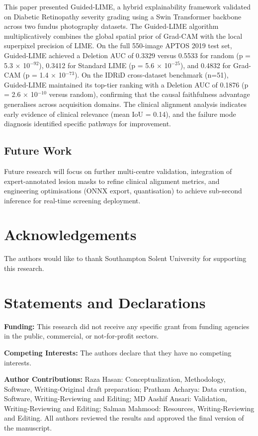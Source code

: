 \documentclass[10pt,twoside]{article}
\begin{document}
This paper presented Guided-LIME, a hybrid explainability framework validated on Diabetic Retinopathy severity grading using a Swin Transformer backbone across two fundus photography datasets. The Guided-LIME algorithm multiplicatively combines the global spatial prior of Grad-CAM with the local superpixel precision of LIME. On the full 550-image APTOS 2019 test set, Guided-LIME achieved a Deletion AUC of 0.3329 versus 0.5533 for random (p = 5.3 $\times$ 10$^{-92}$), 0.3412 for Standard LIME (p = 5.6 $\times$ 10$^{-25}$), and 0.4832 for Grad-CAM (p = 1.4 $\times$ 10$^{-73}$). On the IDRiD cross-dataset benchmark (n=51), Guided-LIME maintained its top-tier ranking with a Deletion AUC of 0.1876 (p = 2.6 $\times$ 10$^{-10}$ versus random), confirming that the causal faithfulness advantage generalises across acquisition domains. The clinical alignment analysis indicates early evidence of clinical relevance (mean IoU = 0.14), and the failure mode diagnosis identified specific pathways for improvement.

\subsection*{Future Work}

Future research will focus on further multi-centre validation, integration of expert-annotated lesion masks to refine clinical alignment metrics, and engineering optimisations (ONNX export, quantisation) to achieve sub-second inference for real-time screening deployment.

\section*{Acknowledgements}

The authors would like to thank Southampton Solent University for supporting this research.

\section*{Statements and Declarations}

\textbf{Funding:} This research did not receive any specific grant from funding agencies in the public, commercial, or not-for-profit sectors.

\textbf{Competing Interests:} The authors declare that they have no competing interests.

\textbf{Author Contributions:} Raza Hasan: Conceptualization, Methodology, Software, Writing-Original draft preparation; Pratham Acharya: Data curation, Software, Writing-Reviewing and Editing; MD Aashif Ansari: Validation, Writing-Reviewing and Editing; Salman Mahmood: Resources, Writing-Reviewing and Editing. All authors reviewed the results and approved the final version of the manuscript.
\end{document}
